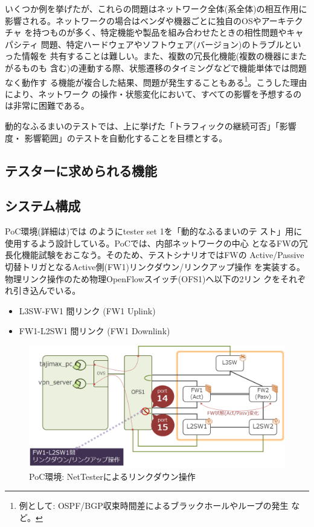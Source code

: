 いくつか例を挙げたが、これらの問題はネットワーク全体(系全体)の相互作用に
影響される。ネットワークの場合はベンダや機器ごとに独自のOSやアーキテクチャ
を持つものが多く、特定機能や製品を組み合わせたときの相性問題やキャパシティ
問題、特定ハードウェアやソフトウェア(バージョン)のトラブルといった情報を
共有することは難しい。また、複数の冗長化機能(複数の機器にまたがるものも
含む)の連動する際、状態遷移のタイミングなどで機能単体では問題なく動作す
る機能が複合した結果、問題が発生することもある\footnote{例として:
OSPF/BGP収束時間差によるブラックホールやループの発生
\cite{j3g14-packet-forwarding}など。}。こうした理由により、ネットワーク
の操作・状態変化において、すべての影響を予想するのは非常に困難である。

動的なふるまいのテストでは、上に挙げた「トラフィックの継続可否」「影響度・
影響範囲」のテストを自動化することを目標とする。

  \subsection{テスターに求められる機能}

  \subsection{システム構成}
PoC環境(詳細は)では
のようにtester set 1を「動的なふるまいのテ
スト」用に使用するよう設計している。PoCでは、\yo 内部ネットワークの中心
となるFWの冗長化機能試験をおこなう。そのため、テストシナリオではFWの
Active/Passive切替トリガとなるActive側(FW1)リンクダウン/リンクアップ操作
を実装する。物理リンク操作のため物理OpenFlowスイッチ(OFS1)へ以下の2リン
クをそれぞれ引き込んでいる。
\begin{itemize}
 \item L3SW-FW1 間リンク (FW1 Uplink)
 \item FW1-L2SW1 間リンク (FW1 Downlink)
\end{itemize}

\begin{figure}[h]
 \centering
 \includegraphics[scale=0.6]{img/poc-env-linkdown.png}
 \caption{PoC環境: NetTesterによるリンクダウン操作}
 \label{fig:poc-env-linkdown}
\end{figure}

